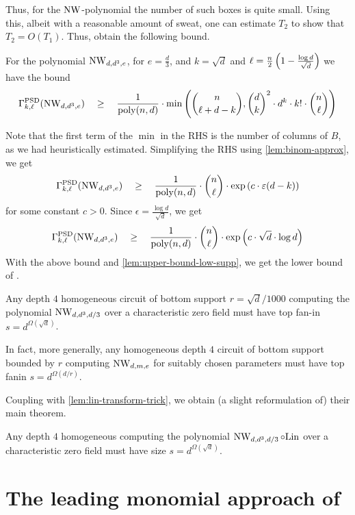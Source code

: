 Thus, for the $\operatorname{\mathrm{NW}}$-polynomial the number of such boxes is quite small. 
Using this, albeit with a reasonable amount of sweat, one can estimate $T_2$ to show that $T_2 = O(T_1)$. 
Thus, \cite{KLSS} obtain the following bound. 

\begin{lemma}
For the polynomial $\operatorname{\mathrm{NW}}_{d,d^3,e}$, for $e = \frac{d}{3}$, and $k = \sqrt{d}$ and $\ell = \frac{n}{2}\left(1 - \frac{\log d}{\sqrt{d}}\right)$ we have the bound
\[
\Gamma^{\mathrm{PSD}}_{k,\ell}(\operatorname{\mathrm{NW}}_{d,d^3,e}) \quad \geq \quad \frac{1}{\operatorname{poly}(n,d)} \cdot \min\left(\binom{n}{\ell + d - k}, \binom{d}{k}^2 \cdot d^k \cdot k! \cdot \binom{n}{\ell}\right)
\]
\end{lemma}
Note that the first term of the $\min$ in the RHS is the number of columns of $B$, as we had heuristically estimated. 
Simplifying the RHS using \autoref{lem:binom-approx}, we get
\[
\Gamma^{\mathrm{PSD}}_{k,\ell}(\operatorname{\mathrm{NW}}_{d,d^3,e}) \quad \geq \quad \frac{1}{\operatorname{poly}(n,d)} \cdot \binom{n}{\ell}\cdot \exp\left(c\cdot \varepsilon (d - k)\right)
\]
for some constant $c > 0$. 
Since $\epsilon = \frac{\log d}{\sqrt{d}}$, we get 
\[
\Gamma^{\mathrm{PSD}}_{k,\ell}(\operatorname{\mathrm{NW}}_{d,d^3,e}) \quad \geq \quad \frac{1}{\operatorname{poly}(n,d)} \cdot \binom{n}{\ell}\cdot \exp\left(c\cdot \sqrt{d}\cdot \log d\right)
\]
With the above bound and \autoref{lem:upper-bound-low-supp}, we get the lower bound of \cite{KLSS}. 
\begin{theorem}\label{thm:KLSS-lowsupp}
Any depth $4$ homogeneous circuit of bottom support $r = \sqrt{d}/1000$ computing the polynomial $\operatorname{\mathrm{NW}}_{d,d^3,d/3}$ over a characteristic zero field must have top fan-in $s = d^{\Omega(\sqrt{d})}$. 

In fact, more generally, any homogeneous depth $4$ circuit of bottom support bounded by $r$ computing $\operatorname{\mathrm{NW}}_{d,m,e}$ for suitably chosen parameters must have top fanin $s = d^{\Omega(d/r)}$. 
\end{theorem}

Coupling with \autoref{lem:lin-transform-trick}, we obtain (a slight reformulation of) their main theorem. 

\begin{theorem}\label{thm:KLSS-main}
Any depth $4$ homogeneous computing the polynomial $\operatorname{\mathrm{NW}}_{d,d^3,d/3}\circ \mathrm{Lin}$ over a characteristic zero field must have size $s = d^{\Omega(\sqrt{d})}$. 
\end{theorem}

\section{The leading monomial approach of \cite{KS14}}
\label{sec:KS-leading-monomial-approach}


